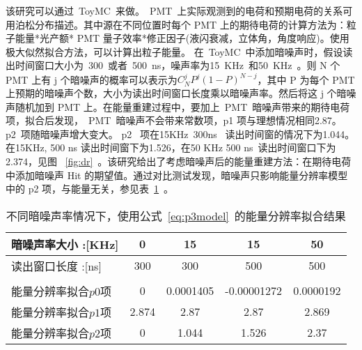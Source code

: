 该研究可以通过~ToyMC~来做。~PMT~上实际观测到的电荷和预期电荷的关系可用泊松分布描述。其中源在不同位置时每个 PMT 上的期待电荷的计算方法为：粒子能量*光产额* PMT 量子效率*修正因子(液闪衰减，立体角，角度响应)。使用极大似然拟合方法，可以计算出粒子能量。
在~ToyMC~中添加暗噪声时，假设读出时间窗口大小为~300~或者~500~ns，噪声率为15~KHz~和50~KHz~。则 N 个 PMT 上有 j 个暗噪声的概率可以表示为$C_N^jP^j(1-P)^{N-j}$，其中 P 为每个 PMT 上预期的暗噪声个数，大小为读出时间窗口长度乘以暗噪声率。然后将这 j 个暗噪声随机加到 PMT 上。在能量重建过程中，要加上~PMT~暗噪声带来的期待电荷项，拟合后发现，~PMT~暗噪声不会带来常数项，p1 项与理想情况相同2.87。 p2~项随暗噪声增大变大。 p2~ 项在15KHz~300ns~ 读出时间窗的情况下为1.044。在15KHz, 500 ns 读出时间窗下为1.526，在50 KHz 500 ns~读出时间窗口下为2.374，见图 ~\ref{fig:dr}~。该研究给出了考虑暗噪声后的能量重建方法：在期待电荷中添加暗噪声 Hit 的期望值。通过对比测试发现，暗噪声只影响能量分辨率模型中的 p2 项，与能量无关，参见表~\ref{tab:tb2}~。
\begin{table}[htb]
\centering  %
\begin{tabular}{lcccc}  %
\hline
暗噪声率大小 :[KHz]&0& 15 &15 &50  \\ \hline
读出窗口长度 :[ns]&300& 300 &500 &500 \\ \hline
\\ 能量分辨率拟合$p0$项 &0&0.0001405&-0.00001272&0.0000192
\\ 能量分辨率拟合$p1$项  &2.874&2.87&2.87&2.869
\\能量分辨率拟合$p2$项 & 0&1.044&1.526&2.37
\\ \hline
\end{tabular}
\caption{不同暗噪声率情况下，使用公式~\ref{eq:p3model}~的能量分辨率拟合结果}
\label{tab:tb2}
\end{table}


